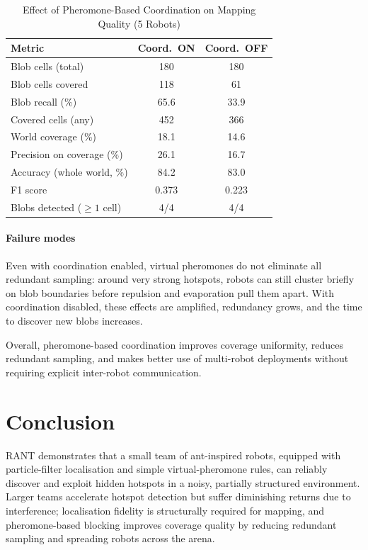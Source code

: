 \documentclass[lettersize,journal]{IEEEtran}
\begin{document}
\begin{table}[t]
\centering
\caption{Effect of Pheromone-Based Coordination on Mapping Quality (5 Robots)}
\label{tab:coordination_comparison}
\begin{tabular}{lcc}
\hline
\textbf{Metric} & \textbf{Coord.\ ON} & \textbf{Coord.\ OFF} \\
\hline
Blob cells (total)              & 180   & 180 \\
Blob cells covered              & 118   & 61 \\
Blob recall (\%)                & 65.6  & 33.9 \\
Covered cells (any)             & 452   & 366 \\
World coverage (\%)             & 18.1  & 14.6 \\
Precision on coverage (\%)      & 26.1  & 16.7 \\
Accuracy (whole world, \%)      & 84.2  & 83.0 \\
F1 score                        & 0.373 & 0.223 \\
Blobs detected ($\geq 1$ cell)        & 4/4   & 4/4 \\
\hline
\end{tabular}
\end{table}

\paragraph{Failure modes}
Even with coordination enabled, virtual pheromones do not eliminate all
redundant sampling: around very strong hotspots, robots can still cluster
briefly on blob boundaries before repulsion and evaporation pull them apart.
With coordination disabled, these effects are amplified, redundancy grows, and
the time to discover new blobs increases.

Overall, pheromone-based coordination improves coverage uniformity, reduces
redundant sampling, and makes better use of multi-robot deployments without
requiring explicit inter-robot communication.











\section{Conclusion }

RANT demonstrates that a small team of ant-inspired robots, equipped with
particle-filter localisation and simple virtual-pheromone rules, can reliably
discover and exploit hidden hotspots in a noisy, partially structured
environment. Larger teams accelerate hotspot detection but suffer diminishing
returns due to interference; localisation fidelity is structurally required for
mapping, and pheromone-based blocking improves coverage quality by reducing
redundant sampling and spreading robots across the arena.
\end{document}
